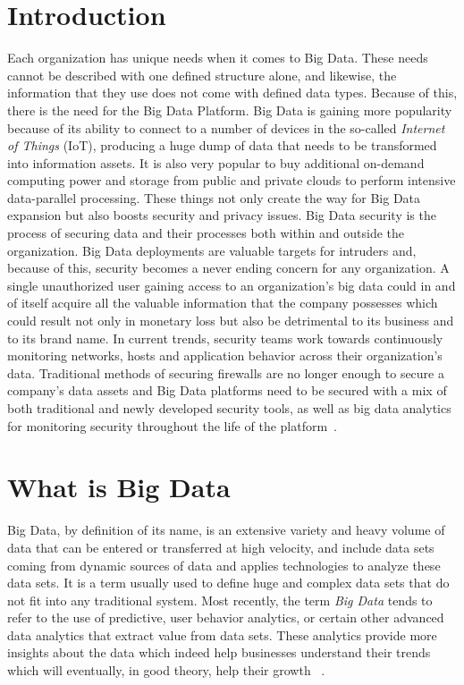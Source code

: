 \section{Introduction}
Each organization has unique needs when it comes to Big Data.  
These needs cannot be described with one defined structure alone,
and likewise, the information that they use does not come with 
defined data types.  Because of this, there is the need for the
Big Data Platform. Big Data is gaining more popularity because 
of its ability to connect to a number of devices in the so-called
{\em Internet of Things} (IoT),  producing a huge dump of data that 
needs to be transformed into information assets. It is also very 
popular to buy additional on-demand computing power and storage
from public and private clouds to perform intensive data-parallel
processing. These things not only create the way for Big Data
expansion but also boosts security and privacy issues. Big Data
security is the process of securing data and their processes 
both within and outside the organization. Big Data deployments
are valuable targets for intruders and, because of this, security
becomes a never ending concern for any organization. A single
unauthorized user gaining access to an  organization's big data
could in and of itself acquire all the valuable information 
that the company possesses which could result not only in monetary
loss but also be detrimental to its business and to its brand name.
In current trends, security teams work towards continuously 
monitoring networks, hosts and application behavior across their
organization's data. Traditional methods of securing firewalls 
are no longer enough to secure a company's data assets and Big 
Data platforms need to be secured with a mix of both traditional
and newly developed security tools, as well as big data analytics
for monitoring security throughout the life of the 
platform~\cite{moura2016}.

\section{What is Big Data}
Big Data, by definition of its name, is an extensive variety and
heavy volume of data that can be entered or transferred at high
velocity, and include data sets coming from dynamic sources of
data and applies technologies to analyze these data sets. It is
a term usually used to define huge and complex data sets that do
not fit into any traditional system. Most recently, the term
{\em Big Data} tends to refer to the use of predictive, user behavior
analytics, or certain other advanced data analytics that extract 
value from data sets. These analytics provide more insights about
the data which indeed help businesses understand their trends
which will eventually, in good theory, help their growth
~\cite{hey2009fourth}.

